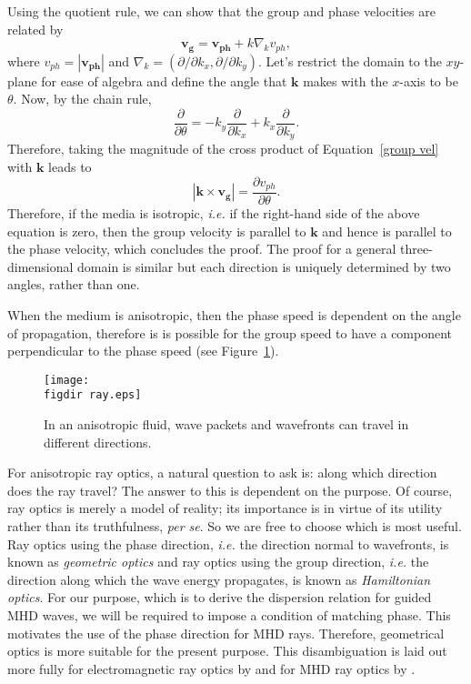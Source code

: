 \documentclass[12pt]{../style-files/ociamthesis}
\begin{document}
	Using the quotient rule, we can show that the group and phase velocities are related by
	\begin{equation}
	\mathbf{v_g} = \mathbf{v_{ph}} + k\nabla_k v_{ph}, \label{group vel}
	\end{equation}
	where $v_{ph} = |\mathbf{v_{ph}}|$ and $\nabla_k = (\partial/\partial k_x, \partial/\partial k_y)$. Let's restrict the domain to the $xy$-plane for ease of algebra and define the angle that $\mathbf{k}$ makes with the $x$-axis to be $\theta$. Now, by the chain rule,
	\begin{equation}
	\frac{\partial}{\partial \theta} = -k_y \frac{\partial}{\partial k_x} + k_x \frac{\partial}{\partial k_y}.
	\end{equation}
	Therefore, taking the magnitude of the cross product of Equation~\eqref{group vel} with $\mathbf{k}$ leads to
	\begin{equation}
	|\mathbf{k} \times \mathbf{v_g}| = \frac{\partial v_{ph}}{\partial \theta}.
	\end{equation}
	Therefore, if the media is isotropic, \textit{i.e.} if the right-hand side of the above equation is zero, then the group velocity is parallel to $\mathbf{k}$ and hence is parallel to the phase velocity, which concludes the proof. The proof for a general three-dimensional domain is similar but each direction is uniquely determined by two angles, rather than one.
	
	When the medium is anisotropic, then the phase speed is dependent on the angle of propagation, therefore is is possible for the group speed to have a component perpendicular to the phase speed (see Figure~\ref{fig: anisotropic ray direction}).
	\begin{figure}
		\centering
		\texttt{[image: \\figdir ray.eps]}
		\caption{In an anisotropic fluid, wave packets and wavefronts can travel in different directions.}
		\label{fig: anisotropic ray direction}
	\end{figure}
	For anisotropic ray optics, a natural question to ask is: along which direction does the ray travel? The answer to this is dependent on the purpose. Of course, ray optics is merely a model of reality; its importance is in virtue of its utility rather than its truthfulness, \textit{per se}. So we are free to choose which is most useful. Ray optics using the phase direction, \textit{i.e.} the direction normal to wavefronts, is known as \textit{geometric optics} and ray optics using the group direction, \textit{i.e.} the direction along which the wave energy propagates, is known as \textit{Hamiltonian optics}. For our purpose, which is to derive the dispersion relation for guided MHD waves, we will be required to impose a condition of matching phase. This motivates the use of the phase direction for MHD rays. Therefore, geometrical optics is more suitable for the present purpose. This disambiguation is laid out more fully for electromagnetic ray optics by \cite{has88} and for MHD ray optics by \cite{wal77}.
	
\end{document}
